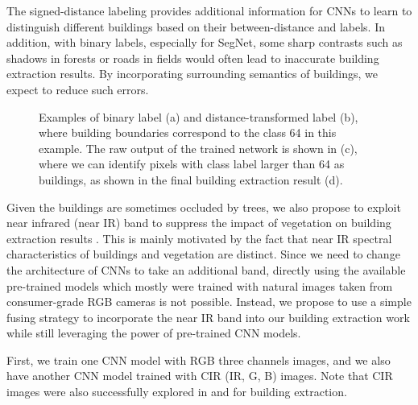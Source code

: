 \documentclass[journal]{IEEEtran}
\begin{document}
The signed-distance labeling provides additional information for CNNs to learn to distinguish different buildings based on their between-distance and labels. In addition, with binary labels, especially for SegNet, some sharp contrasts such as shadows in forests or roads in fields would often lead to inaccurate building extraction results. By incorporating surrounding semantics of buildings, we expect to reduce such errors.   

\begin{figure} 
    \centering
    \label{label_demo_a}
    \label{label_demo_b}
    \label{label_demo_c}
    \label{label_demo_d}
  \caption{Examples of binary label (a) and distance-transformed label (b), where building boundaries correspond to the class 64 in this example. The raw output of the trained network is shown in (c), where we can identify pixels with class label larger than 64 as buildings, as shown in the final building extraction result (d).  }
  \label{fig:label_demo} 
\end{figure}


Given the buildings are sometimes occluded by trees, we also propose to exploit near infrared (near IR) band to suppress the impact of vegetation on building extraction results  \cite{JinDavis2005}. This is mainly motivated by the fact that near IR spectral characteristics of buildings and vegetation are distinct. Since we need to change the architecture of CNNs to take an additional band, directly using the available pre-trained models which mostly were trained with natural images taken from consumer-grade RGB cameras is not possible. Instead, 
we propose to use a simple fusing strategy to incorporate the near IR band into our building extraction work while still leveraging the power of pre-trained CNN models. 

First, we train one CNN model with RGB three channels images, and we also have another CNN model trained with CIR (IR, G, B) images. Note that CIR images were also successfully explored in \cite{Sherrah2016} and \cite{VakalopoulouKarantzalosKomodakisEtAl2015} for building extraction. 
\end{document}
